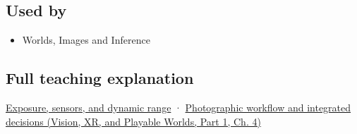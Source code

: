 \subsection{Used by}\label{appendix-92d45cdf2afc-used-by}

\hypertarget{appendix-92d45cdf2afc-used-by}{}

\begin{itemize}
\tightlist
\item
  {Worlds, Images and Inference}
\end{itemize}

\subsection{Full teaching explanation}\label{appendix-92d45cdf2afc-full-teaching-explanation}

\hypertarget{appendix-92d45cdf2afc-full-teaching-explanation}{}

\hyperref[03-visual-computing-i-ch003-exposure-sensors-and-dynamic-range]{Exposure, sensors, and dynamic range} · \href{../07-Vision-XR-and-Playable-Worlds-P01/main.pdf\#nameddest=04-visual-computing-ii-ch034-photographic-workflow-and-integrated-decisions}{Photographic workflow and integrated decisions (Vision, XR, and Playable Worlds, Part 1, Ch. 4)}
